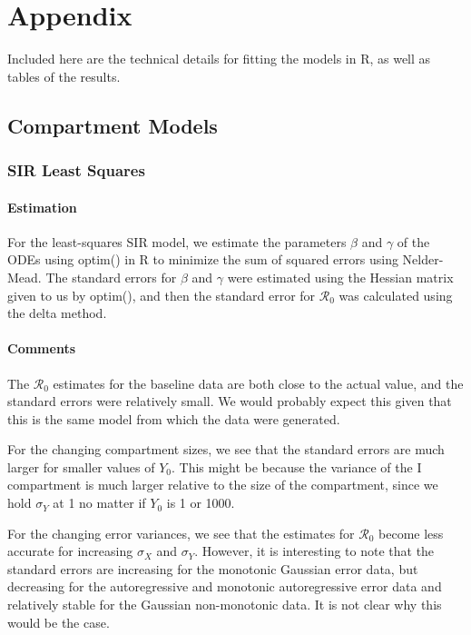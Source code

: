 \documentclass[12pt]{article}
\newcommand{\rr}{\ensuremath{\mathcal{R}_0}}
\begin{document}



\section{Appendix}

Included here are the technical details for fitting the models in R, as well as tables of the results.

\subsection{Compartment Models}

\subsubsection{SIR Least Squares}

\paragraph{Estimation}

For the least-squares SIR model, we estimate the parameters $\beta$ and $\gamma$ of the ODEs using optim() in R to minimize the sum of squared errors using Nelder-Mead. The standard errors for $\beta$ and $\gamma$ were estimated using the Hessian matrix given to us by optim(), and then the standard error for $\rr$ was calculated using the delta method.

\paragraph{Comments}

The $\rr$ estimates for the baseline data are both close to the actual value, and the standard errors were relatively small. We would probably expect this given that this is the same model from which the data were generated. 

For the changing compartment sizes, we see that the standard errors are much larger for smaller values of $Y_0$. This might be because the variance of the I compartment is much larger relative to the size of the compartment, since we hold $\sigma_Y$ at 1 no matter if $Y_0$ is 1 or 1000. 

For the changing error variances, we see that the estimates for $\rr$ become less accurate for increasing $\sigma_X$ and $\sigma_Y$. However, it is interesting to note that the standard errors are increasing for the monotonic Gaussian error data, but decreasing for the autoregressive and monotonic autoregressive error data and relatively stable for the Gaussian non-monotonic data. It is not clear why this would be the case.
\end{document}
